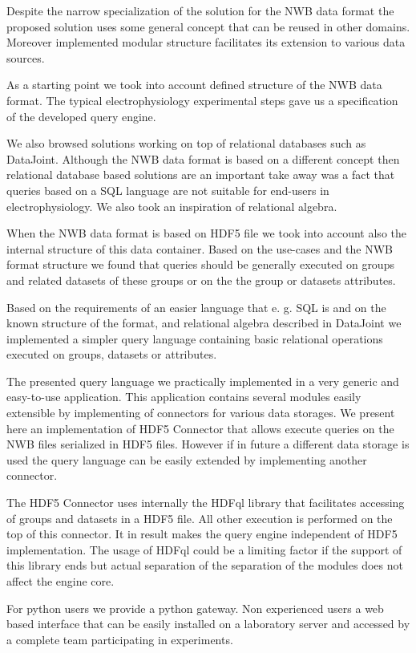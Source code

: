 \documentclass[utf8]{frontiersSCNS} %
\begin{document}
Despite the narrow specialization of the solution for the NWB data format the proposed solution uses some general concept that can be reused in other domains. Moreover implemented modular structure facilitates its extension to various data sources.

As a starting point we took into account defined structure of the NWB data format. The typical electrophysiology experimental steps gave us a specification of the developed query engine. 

We also browsed solutions working on top of relational databases such as DataJoint. Although the NWB data format is based on a different concept then relational database based solutions are an important take away was a fact that queries based on a SQL language are not suitable for end-users in electrophysiology. We also took an inspiration of relational algebra.

When the NWB data format is based on HDF5 file we took into account also the internal structure of this data container. Based on the use-cases and the NWB format structure we found that queries should be generally executed on groups and related datasets of these groups or on the the group or datasets attributes.

Based on the requirements of an easier language that e. g. SQL is and on the known structure of the format, and relational algebra described in DataJoint we implemented a simpler query language containing basic relational operations executed on groups, datasets or attributes.

The presented query language we practically implemented in a very generic and easy-to-use application. This application contains several modules easily extensible by implementing of connectors for various data storages. We present here an implementation of HDF5 Connector that allows execute queries on the NWB files serialized in HDF5 files. However if in future a different data storage is used the query language can be easily extended by implementing another connector.

The HDF5 Connector uses internally the HDFql library that facilitates accessing of groups and datasets in a HDF5 file. All other execution is performed on the top of this connector. It in result makes the query engine independent of HDF5 implementation. The usage of HDFql could be a limiting factor if the support of this library ends but actual separation of the separation of the modules does not affect the engine core. 

For python users we provide a python gateway. Non experienced users a web based interface that can be easily installed on a laboratory server and accessed by a complete team participating in experiments.
\end{document}
